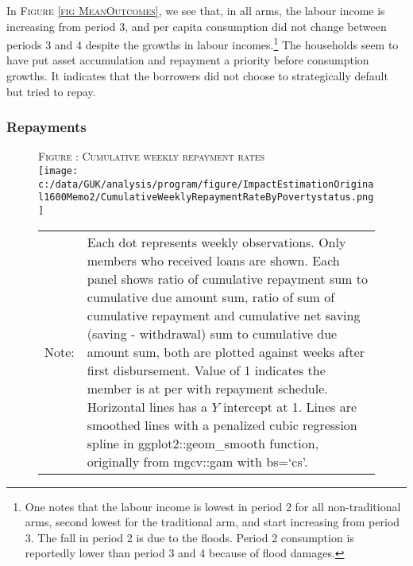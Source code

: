 	In \textsc{\footnotesize Figure \ref{fig MeanOutcomes}}, we see that, in all arms, the labour income is increasing from period 3, and per capita consumption did not change between periods 3 and 4 despite the growths in labour incomes.\footnote{One notes that the labour income is lowest in period 2 for all non-\textsf{traditional} arms, second lowest for the \textsf{traditional} arm, and start increasing from period 3. The fall in period 2 is due to the floods. Period 2 consumption is reportedly lower than period 3 and 4 because of flood damages. } %
	The households seem to have put asset accumulation and repayment a priority before consumption growths. It indicates that the borrowers did not choose to strategically default but tried to repay. 

\subsubsection{Repayments}

\begin{figure}
\hfil\textsc{\footnotesize Figure \thefigure: Cumulative weekly repayment rates\label{fig weeklysavingrepayrate}}\\
\hfil\texttt{[image: c:/data/GUK/analysis/program/figure/ImpactEstimationOriginal1600Memo2/CumulativeWeeklyRepaymentRateByPovertystatus.png]}\\
\renewcommand{\arraystretch}{1}
\hfil\begin{tabular}{>{\hfill\scriptsize}p{1cm}<{}>{\scriptsize}p{12cm}<{\hfill}}
Note:& Each dot represents weekly observations. Only members who received loans are shown. Each panel shows ratio of cumulative repayment sum to cumulative due amount sum, ratio of sum of cumulative repayment and cumulative net saving (saving - withdrawal) sum to cumulative due amount sum, both are plotted against weeks after first disbursement. Value of 1 indicates the member is at per with repayment schedule. Horizontal lines has a $Y$ intercept at 1. Lines are smoothed lines with a penalized cubic regression spline in \textsf{ggplot2::geom\_smooth} function, originally from \textsf{mgcv::gam} with \textsf{bs=`cs'}. \\[-1ex]
\end{tabular}
\end{figure}



